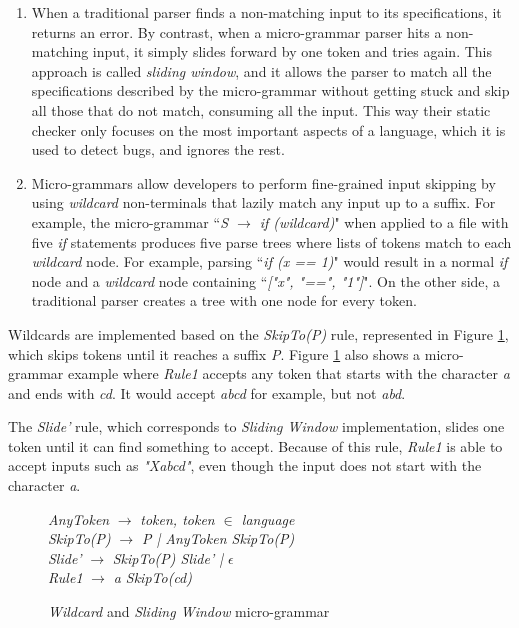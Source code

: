 \begin{enumerate}
  \item When a traditional parser finds a non-matching input to its specifications, it returns an error. By contrast, when a micro-grammar parser hits a non-matching input, it simply slides forward by one token and tries again. This approach is called \textit{sliding window}, and it allows the parser to match all the specifications described by the micro-grammar without getting stuck and skip all those that do not match, consuming all the input. 
This way their static checker only focuses on the most important aspects of a language, which it is used to detect bugs, and ignores the rest. 


\item  Micro-grammars allow developers to perform fine-grained input skipping by using \textit{wildcard} non-terminals that lazily match any input up to a suffix. For example, the micro-grammar ``\textit{S  \( \rightarrow \) if (wildcard)}" when applied to a file with five \textit{if} statements produces five parse trees where lists of tokens match to each \textit{wildcard} node. For example, parsing ``\textit{if (x == 1)}" would result in a normal \textit{if} node and a \textit{wildcard} node containing ``\textit{["x", "==", "1"]}". On the other side, a traditional parser creates a tree with one node for every token.
\end{enumerate}


Wildcards are implemented based on the \textit{SkipTo(P)} rule, represented in Figure \ref{skipTo}, which skips tokens until it reaches a suffix \textit{P}. Figure \ref{skipTo} also shows a micro-grammar example where \textit{Rule1} accepts any token that starts with the character \textit{a} and ends with \textit{cd}. It would accept \textit{abcd} for example, but not \textit{abd}. 

The \textit{Slide'} rule, which corresponds to \textit{Sliding Window} implementation, slides one token until it can find something to accept. Because of this rule, \textit{Rule1} is able to accept inputs such as \textit{"Xabcd"}, even though the input does not start with the character \textit{a}.
 
\begin{figure}
\centering
\begin{minipage}{.5\linewidth}
\textit{AnyToken} \( \rightarrow \) \textit{token, token \(\in\) language}\\
\textit{SkipTo(P)}  \( \rightarrow \) \textit{P | AnyToken SkipTo(P)} \\
\textit{Slide'} \( \rightarrow \) \textit{SkipTo(P) Slide' |  \(\epsilon\)} \\
\textit{Rule1} \( \rightarrow \) \textit{a SkipTo(cd)}
\end{minipage}    

\caption{\textit{Wildcard} and \textit{Sliding Window} micro-grammar}
    \label{skipTo}
\end{figure} 


